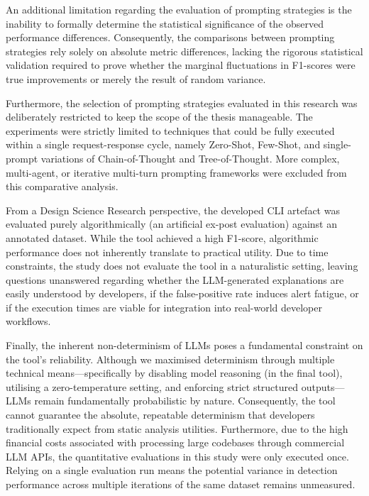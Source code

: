 An additional limitation regarding the evaluation of prompting strategies is the inability to formally determine the statistical significance of the observed performance differences. Consequently, the comparisons between prompting strategies rely solely on absolute metric differences, lacking the rigorous statistical validation required to prove whether the marginal fluctuations in F1-scores were true improvements or merely the result of random variance.

Furthermore, the selection of prompting strategies evaluated in this research was deliberately restricted to keep the scope of the thesis manageable. The experiments were strictly limited to techniques that could be fully executed within a single request-response cycle, namely Zero-Shot, Few-Shot, and single-prompt variations of Chain-of-Thought and Tree-of-Thought. More complex, multi-agent, or iterative multi-turn prompting frameworks were excluded from this comparative analysis.

From a Design Science Research perspective, the developed CLI artefact was evaluated purely algorithmically (an artificial ex-post evaluation) against an annotated dataset. While the tool achieved a high F1-score, algorithmic performance does not inherently translate to practical utility. Due to time constraints, the study does not evaluate the tool in a naturalistic setting, leaving questions unanswered regarding whether the LLM-generated explanations are easily understood by developers, if the false-positive rate induces alert fatigue, or if the execution times are viable for integration into real-world developer workflows.

Finally, the inherent non-determinism of LLMs poses a fundamental constraint on the tool's reliability. Although we maximised determinism through multiple technical means—specifically by disabling model reasoning (in the final tool), utilising a zero-temperature setting, and enforcing strict structured outputs—LLMs remain fundamentally probabilistic by nature. Consequently, the tool cannot guarantee the absolute, repeatable determinism that developers traditionally expect from static analysis utilities. Furthermore, due to the high financial costs associated with processing large codebases through commercial LLM APIs, the quantitative evaluations in this study were only executed once. Relying on a single evaluation run means the potential variance in detection performance across multiple iterations of the same dataset remains unmeasured.


